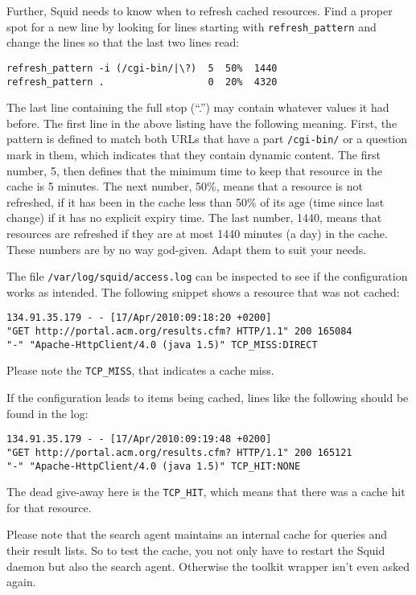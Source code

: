 \documentclass[12pt]{book}
\begin{document}
Further, Squid needs to know when to refresh cached resources. Find a proper spot for a new line by looking for lines starting with {\tt refresh\_pattern} and change the lines so that the last two lines read:

\begin{verbatim}
refresh_pattern -i (/cgi-bin/|\?)  5  50%  1440
refresh_pattern .                  0  20%  4320
\end{verbatim}

The last line containing the full stop (``.'') may contain whatever values it had before. The first line in the above listing have the following meaning. First, the pattern is defined to match both URLs that have a part {\tt /cgi-bin/} or a question mark in them, which indicates that they contain dynamic content. The first number, 5, then defines that the minimum time to keep that resource in the cache is 5 minutes. The next number, 50\%, means that a resource is not refreshed, if it has been in the cache less than 50\% of its age (time since last change) if it has no explicit expiry time. The last number, 1440, means that resources are refreshed if they are at most 1440 minutes (a day) in the cache. These numbers are by no way god-given. Adapt them to suit your needs. 

The file {\tt /var/log/squid/access.log} can be inspected to see if the configuration works as intended. The following snippet shows a resource that was not cached:

\begin{verbatim}
134.91.35.179 - - [17/Apr/2010:09:18:20 +0200] 
"GET http://portal.acm.org/results.cfm? HTTP/1.1" 200 165084 
"-" "Apache-HttpClient/4.0 (java 1.5)" TCP_MISS:DIRECT 
\end{verbatim}

Please note the {\tt TCP\_MISS}, that indicates a cache miss.

If the configuration leads to items being cached, lines like the following should be found in the log:

\begin{verbatim}
134.91.35.179 - - [17/Apr/2010:09:19:48 +0200] 
"GET http://portal.acm.org/results.cfm? HTTP/1.1" 200 165121 
"-" "Apache-HttpClient/4.0 (java 1.5)" TCP_HIT:NONE 
\end{verbatim}

The dead give-away here is the {\tt TCP\_HIT}, which means that there was a cache hit for that resource.

Please note that the search agent maintains an internal cache for queries and their result lists. So to test the cache, you not only have to restart the Squid daemon but also the search agent. Otherwise the toolkit wrapper isn't even asked again.
  
\end{document}
